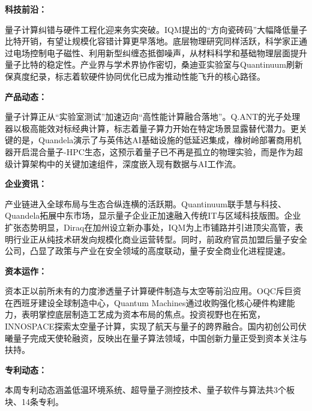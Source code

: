 \documentclass[12pt,a4paper]{ctexart}
\begin{document}
\textbf{ 科技前沿：}

量子计算纠错与硬件工程化迎来务实突破。IQM提出的“方向瓷砖码”大幅降低量子比特开销，有望让规模化容错计算更早落地。底层物理研究同样活跃，科学家正通过电场控制电子磁性、利用新型纠缠态抵御噪声，从材料科学和基础物理层面提升量子比特的稳定性。产业界与学术界协作密切，桑迪亚实验室与Quantinuum刷新保真度纪录，标志着软硬件协同优化已成为推动性能飞升的核心路径。


\textbf{ 产品动态：}

量子计算正从“实验室测试”加速迈向“高性能计算融合落地”。Q.ANT的光子处理器以极高能效对标经典计算，标志着量子算力开始在特定场景显露替代潜力。更关键的是，Quandela演示了与英伟达AI基础设施的低延迟集成，橡树岭部署商用机器开启混合量子-HPC生态，这预示着量子已不再是孤立的物理实验，而是作为超级计算架构中的关键加速组件，深度嵌入现有数据与AI工作流。


\textbf{ 企业资讯：}

产业链进入全球布局与生态合纵连横的活跃期。Quantinuum联手慧与科技、Quandela拓展中东市场，显示量子企业正加速融入传统IT与区域科技版图。企业扩张态势明显，Diraq在加州设立新办事处，IQM为上市铺路并引进顶尖高管，表明行业正从纯技术研发向规模化商业运营转型。同时，前政府官员加盟后量子安全公司，凸显了政策与产业在安全领域的高度联动，量子安全商业化进程提速。


\textbf{ 资本运作：}

资本正以前所未有的力度渗透量子计算硬件制造与太空等前沿应用。OQC斥巨资在西班牙建设全球制造中心，Quantum Machines通过收购强化核心硬件构建能力，表明掌控底层制造工艺成为资本布局的焦点。投资视野也在拓宽，INNOSPACE探索太空量子计算，实现了航天与量子的跨界融合。国内初创公司伏曦量子完成天使轮融资，反映出在量子算法领域，中国创新力量正受到资本关注与扶持。




\textbf{ 专利动态：}

本周专利动态涵盖低温环境系统、超导量子测控技术、量子软件与算法共3个板块、14条专利。
\end{document}
